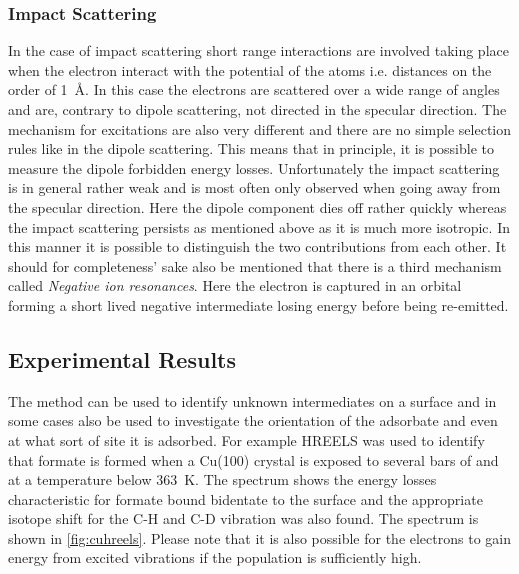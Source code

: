 \subsubsection{Impact Scattering}
In the case of impact scattering  short range interactions are involved taking  place when the electron interact with the potential of the atoms i.e. distances  on the order of \SI{1}{\angstrom}. In this case the electrons are scattered over a wide range of angles and are, contrary to dipole scattering, not directed in the specular direction. The mechanism for excitations are also very different and there are no simple selection rules like in the dipole scattering. This means that in principle, it is possible to measure the dipole forbidden energy losses. Unfortunately the impact scattering is in general rather weak and is most often only observed when going away from the specular direction. Here the dipole component dies off rather quickly whereas the impact scattering persists as mentioned above as it is much more isotropic. In this manner it is possible to distinguish the two contributions from each other. It should for completeness' sake also be mentioned that there is a third mechanism called \emph{Negative ion resonances}. Here the electron is captured in an orbital forming a short lived negative intermediate losing energy before being re-emitted. 

\subsection{Experimental Results}
The method can be used to identify unknown intermediates on a surface and in some cases also be used to investigate the orientation of the adsorbate and even at what sort of site it is adsorbed. For example HREELS was used to identify that formate is formed when a Cu(100) crystal is exposed to several bars of  and  at a temperature below \SI{363}{K}. The spectrum shows the energy losses characteristic for formate bound bidentate to the surface and the appropriate isotope shift for the C-H and C-D vibration was also found. The spectrum is shown in \autoref{fig:cuhreels}. Please note that it is also possible for the electrons to gain energy from excited vibrations if the population is sufficiently high.

